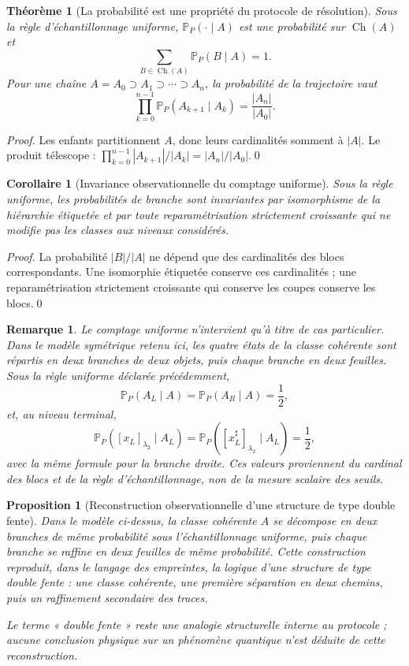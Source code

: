 \documentclass[11pt,a4paper,openany]{book}
\newtheorem{proposition}[definition]{Proposition}
\newtheorem{theorem}[definition]{Théorème}
\newtheorem{corollary}[definition]{Corollaire}
\newtheorem{remark}[definition]{Remarque}
\begin{document}
\begin{theorem}[La probabilité est une propriété du protocole de résolution]
Sous la règle d'échantillonnage uniforme, \(\mathbb P_P(\cdot\mid A)\) est une probabilité sur \(\operatorname{Ch}(A)\) et
\[
\sum_{B\in\operatorname{Ch}(A)}\mathbb P_P(B\mid A)=1.
\]
Pour une chaîne \(A=A_0\supset A_1\supset\cdots\supset A_n\), la probabilité de la trajectoire vaut
\[
\prod_{k=0}^{n-1}\mathbb P_P(A_{k+1}\mid A_k)=\frac{|A_n|}{|A_0|}.
\]
\end{theorem}
\begin{proof}
Les enfants partitionnent \(A\), donc leurs cardinalités somment à \(|A|\). Le produit télescope : \(\prod_{k=0}^{n-1}|A_{k+1}|/|A_k|=|A_n|/|A_0|\).\qed\end{proof}

\begin{corollary}[Invariance observationnelle du comptage uniforme]
Sous la règle uniforme, les probabilités de branche sont invariantes par isomorphisme de la hiérarchie étiquetée et par toute reparamétrisation strictement croissante qui ne modifie pas les classes aux niveaux considérés.
\end{corollary}
\begin{proof}
La probabilité \(|B|/|A|\) ne dépend que des cardinalités des blocs correspondants. Une isomorphie étiquetée conserve ces cardinalités ; une reparamétrisation strictement croissante qui conserve les coupes conserve les blocs.\qed\end{proof}

\begin{remark}
Le comptage uniforme n'intervient qu'à titre de cas particulier. Dans le modèle symétrique retenu ici, les quatre états de la classe cohérente sont répartis en deux branches de deux objets, puis chaque branche en deux feuilles. Sous la règle uniforme déclarée précédemment,
\[
\mathbb P_P(A_L\mid A)=\mathbb P_P(A_R\mid A)=\frac12,
\]
et, au niveau terminal,
\[
\mathbb P_P([x_L]_{\lambda_2}\mid A_L)=\mathbb P_P([x_L^\sharp]_{\lambda_2}\mid A_L)=\frac12,
\]
avec la même formule pour la branche droite. Ces valeurs proviennent du cardinal des blocs et de la règle d'échantillonnage, non de la mesure scalaire des seuils.
\end{remark}

\begin{proposition}[Reconstruction observationnelle d'une structure de type double fente]
Dans le modèle ci-dessus, la classe cohérente \(A\) se décompose en deux branches de même probabilité sous l'échantillonnage uniforme, puis chaque branche se raffine en deux feuilles de même probabilité. Cette construction reproduit, dans le langage des empreintes, la logique d'une structure de type double fente : une classe cohérente, une première séparation en deux chemins, puis un raffinement secondaire des traces.

Le terme « double fente » reste une analogie structurelle interne au protocole ; aucune conclusion physique sur un phénomène quantique n'est déduite de cette reconstruction.
\end{proposition}
\end{document}
